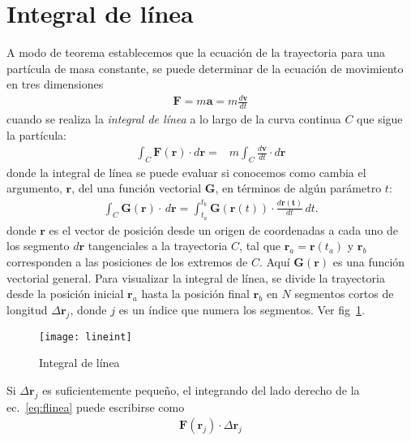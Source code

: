 \section{Integral de línea}
A modo de teorema establecemos que la ecuación de la trayectoria para una partícula de masa constante, se puede determinar de la ecuación de movimiento  en tres dimensiones
\begin{align*}
  \mathbf{F}=m\mathbf{a}=m \frac{d\mathbf{v}}{dt}
\end{align*}
cuando se realiza la \emph{integral de línea} a lo largo de la curva continua $C$ que sigue la partícula:
\begin{align}
\label{eq:flinea}
   \int_C\mathbf{F}(\mathbf{r})\cdot d\mathbf{r}=&m\int_C\frac{d\mathbf{v}}{dt}\cdot d\mathbf{r}
\end{align}
donde la integral de línea se puede evaluar si conocemos como cambia el argumento, $\mathbf{r}$, del una función vectorial $\mathbf{G}$, en términos de algún parámetro $t$:
\begin{align}
  \label{eq:e12}
  \int_C \mathbf{G}(\mathbf{r})\cdot\,d\mathbf{r} = \int_{t_a}^{t_b} \mathbf{G}(\mathbf{r}(t))\cdot\frac{d\mathbf{r(t)}}{dt}\,dt.
\end{align}
donde $\mathbf{r}$ es el vector de posición desde un origen de coordenadas a cada uno de los segmento $d\mathbf{r}$ tangenciales a la trayectoria $C$, tal que $\mathbf{r}_a=\mathbf{r}(t_a)$ y $\mathbf{r}_b$ corresponden a las posiciones de los extremos de $C$. Aquí $\mathbf{G}(\mathbf{r})$ es una función vectorial general. Para visualizar la integral de línea, se divide la trayectoria desde la posición inicial $\mathbf{r}_a$ hasta la posición final $\mathbf{r}_b$ en $N$ segmentos cortos de longitud $\Delta \mathbf{r}_j$, donde $j$ es un índice que numera los segmentos.  Ver fig~\ref{fig:lineint}.

\begin{frame}
\begin{figure}
  \centering
  \texttt{[image: lineint]}
  \caption{Integral de línea}
  \label{fig:lineint}
\end{figure}
\end{frame}

Si $\Delta \mathbf{r}_j$ es suficientemente pequeño, el integrando del lado derecho de la ec.~\eqref{eq:flinea} puede escribirse como
\begin{align}
  \label{eq:dW}
  \mathbf{F}(\mathbf{r}_j)\cdot\Delta\mathbf{r}_j
\end{align}

